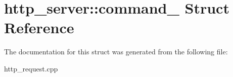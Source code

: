 \hypertarget{structhttp__server_1_1command__}{\section{http\-\_\-server\-:\-:command\-\_\- \-Struct \-Reference}
\label{structhttp__server_1_1command__}
}


\-The documentation for this struct was generated from the following file\-:\begin{DoxyCompactItemize}
\item 
http\-\_\-request.\-cpp\end{DoxyCompactItemize}
